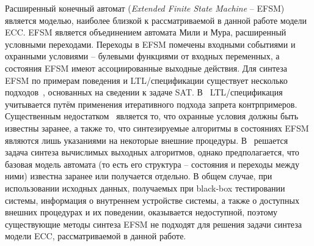Расширенный конечный автомат (\textit{Extended Finite State Machine} \--- EFSM) является моделью, наиболее близкой к рассматриваемой в данной работе модели ECC\@. EFSM является объединением автомата Мили и Мура, расширенный условными переходами. Переходы в EFSM помечены входными событиями и охранными условиями \--- булевыми функциями от входных переменных, а состояния EFSM имеют ассоциированные выходные действия.
Для синтеза EFSM по примерам поведения и LTL\-/спецификации существует несколько подходов~\cite{efsm-tools,walkinshaw}, основанных на сведении к задаче SAT. В~\cite{efsm-tools} LTL\-/спецификация учитывается путём применения итеративного подхода запрета контрпримеров.
Существенным недостатком~\cite{efsm-tools} является то, что охранные условия должны быть известны заранее, а также то, что синтезируемые алгоритмы в состояниях EFSM являются лишь указаниями на некоторые внешние процедуры.
В~\cite{walkinshaw} решается задача синтеза вычислимых выходных алгоритмов, однако предполагается, что базовая модель автомата (то есть его структура \--- состояния и переходы между ними) известна заранее или получается отдельно.
В общем случае, при использовании исходных данных, получаемых при black-box тестировании системы, информация о внутреннем устройстве системы, а также о доступных внешних процедурах и их поведении, оказывается недоступной, поэтому существующие методы синтеза EFSM не подходят для решения задачи синтеза модели ECC, рассматриваемой в данной работе.

